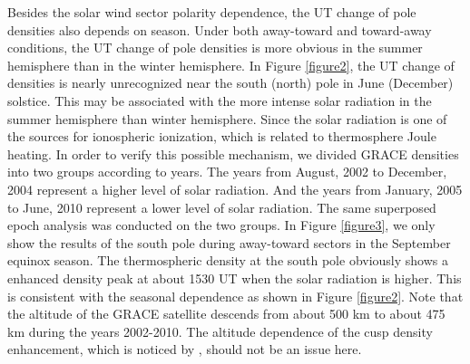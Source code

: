 \documentclass[draft, grl]{/home/guod/Documents/template/agu_template/AGUTeX}
\begin{document}
\begin{article}
    Besides the solar wind sector polarity dependence, the UT change of pole
    densities also depends on season.
    Under both away-toward and toward-away conditions, the UT change of pole 
    densities is more obvious in the summer hemisphere than in the winter
    hemisphere. 
    In Figure \ref{figure2}, the UT change of densities is nearly unrecognized
    near the south (north) pole in June (December) solstice. 
    This may be associated with the more intense solar radiation in the summer 
    hemisphere than winter hemisphere. 
    Since the solar radiation is one of the sources for ionospheric ionization, 
    which is related to thermosphere Joule heating. 
    In order to verify this possible mechanism, we divided GRACE densities into 
    two groups according to years.
    The years from August, 2002 to December, 2004 represent a higher level of
    solar radiation. 
    And the years from January, 2005 to June, 2010 represent a lower level of
    solar radiation. 
    The same superposed epoch analysis was conducted on the two groups.
    In Figure \ref{figure3}, we only show the results of the south pole during 
    away-toward sectors in the September equinox season. 
    The thermospheric density at the south pole obviously shows a enhanced 
    density peak at about 1530 UT when the solar radiation is higher. 
    This is consistent with the seasonal dependence as shown in Figure 
    \ref{figure2}. 
    Note that the altitude of the GRACE satellite descends from about 500 km to 
    about 475 km during the years 2002-2010. 
    The altitude dependence of the cusp density enhancement, which is noticed by
    \citet{Clemmons2008}, should not be an issue here.


\end{article}
\end{document}
